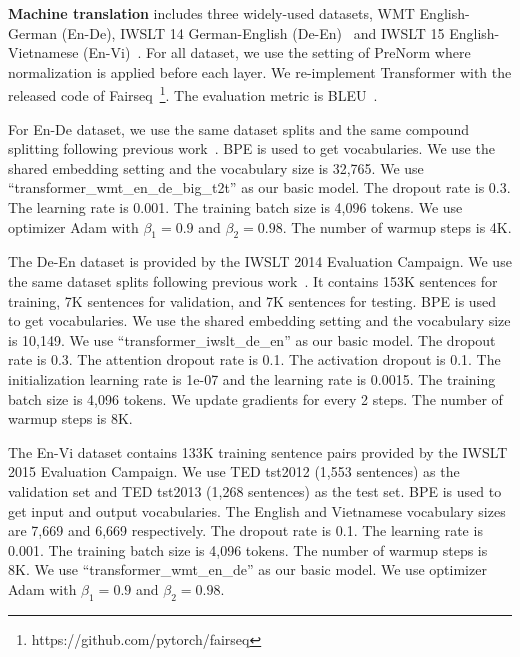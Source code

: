 \documentclass{article}
\begin{document}
\textbf{Machine translation} includes three widely-used datasets,  WMT English-German (En-De), IWSLT 14 German-English (De-En)~\citep{cettolo2014iwslt} and IWSLT 15 English-Vietnamese (En-Vi)~\citep{cettolo2015iwslt}.  For all dataset, 
we use the setting of PreNorm where normalization is applied before each layer.   We re-implement Transformer with the released code of Fairseq~\citep{ott2019fairseq}\footnote{https://github.com/pytorch/fairseq}. 
The evaluation metric is BLEU~\citep{DBLP:conf/acl/PapineniRWZ02}. 
  
  
For En-De dataset, we use the same dataset splits and the same compound splitting following previous work~\citep{DBLP:conf/nips/VaswaniSPUJGKP17}. BPE is used to get vocabularies. We use the shared embedding setting and the vocabulary size is 32,765. We use ``transformer\_wmt\_en\_de\_big\_t2t'' as our basic model.   The dropout rate is 0.3. The learning rate is 0.001. The training batch size is  4,096 tokens. We use optimizer Adam with $\beta_1 = 0.9$ and $\beta_2= 0.98$.  The number of warmup steps is 4K. 



The De-En dataset is provided by the IWSLT 2014 Evaluation Campaign.  We use the same dataset splits following previous work~\citep{ott2019fairseq,DBLP:journals/corr/RanzatoCAZ15,DBLP:conf/emnlp/WisemanR16}. It contains 153K sentences for training, 7K sentences for validation, and 7K sentences for testing. BPE is used to get vocabularies. We use the shared embedding setting and the vocabulary size is 10,149. We use ``transformer\_iwslt\_de\_en'' as our basic model.  The dropout rate is 0.3. The attention dropout rate is  0.1. The activation dropout is 0.1. The initialization learning rate is 1e-07 and the learning rate is 0.0015. The training batch size is  4,096 tokens. We  update gradients for every 2 steps. The number of warmup steps is 8K. 


  The En-Vi dataset contains 133K training sentence pairs provided by the IWSLT 2015 Evaluation Campaign. We use TED
tst2012 (1,553 sentences) as the validation set  and TED tst2013 (1,268 sentences) as the test set. BPE is used to get input and output vocabularies. The English and Vietnamese vocabulary sizes are 7,669 and 6,669 respectively.  The dropout rate is 0.1. The learning rate is 0.001. The training batch size is  4,096 tokens. The number of warmup steps is 8K. We use ``transformer\_wmt\_en\_de'' as our basic model. We use optimizer Adam with $\beta_1 = 0.9$ and $\beta_2= 0.98$. 
\end{document}
